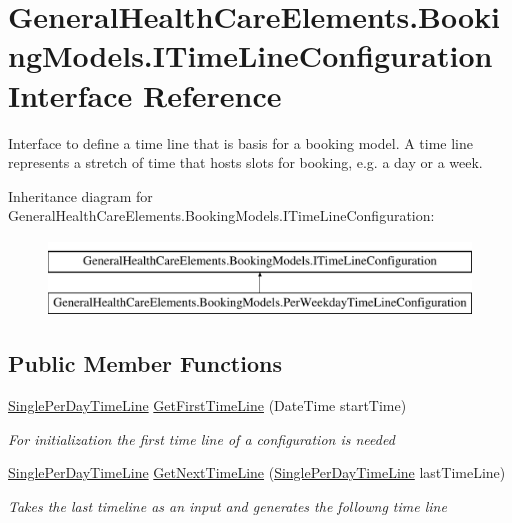 \hypertarget{interface_general_health_care_elements_1_1_booking_models_1_1_i_time_line_configuration}{}\section{General\+Health\+Care\+Elements.\+Booking\+Models.\+I\+Time\+Line\+Configuration Interface Reference}
\label{interface_general_health_care_elements_1_1_booking_models_1_1_i_time_line_configuration}


Interface to define a time line that is basis for a booking model. A time line represents a stretch of time that hosts slots for booking, e.\+g. a day or a week.  


Inheritance diagram for General\+Health\+Care\+Elements.\+Booking\+Models.\+I\+Time\+Line\+Configuration\+:\begin{figure}[H]
\begin{center}
\leavevmode
\includegraphics[height=2.000000cm]{interface_general_health_care_elements_1_1_booking_models_1_1_i_time_line_configuration}
\end{center}
\end{figure}
\subsection*{Public Member Functions}
\begin{DoxyCompactItemize}
\item 
\hyperlink{class_general_health_care_elements_1_1_booking_models_1_1_single_per_day_time_line}{Single\+Per\+Day\+Time\+Line} \hyperlink{interface_general_health_care_elements_1_1_booking_models_1_1_i_time_line_configuration_a32ab23cf6e256ac1391eada96740e3ed}{Get\+First\+Time\+Line} (Date\+Time start\+Time)
\begin{DoxyCompactList}\small\item\em For initialization the first time line of a configuration is needed \end{DoxyCompactList}\item 
\hyperlink{class_general_health_care_elements_1_1_booking_models_1_1_single_per_day_time_line}{Single\+Per\+Day\+Time\+Line} \hyperlink{interface_general_health_care_elements_1_1_booking_models_1_1_i_time_line_configuration_ac9cad79d8ee87386078722a848f837ec}{Get\+Next\+Time\+Line} (\hyperlink{class_general_health_care_elements_1_1_booking_models_1_1_single_per_day_time_line}{Single\+Per\+Day\+Time\+Line} last\+Time\+Line)
\begin{DoxyCompactList}\small\item\em Takes the last timeline as an input and generates the followng time line \end{DoxyCompactList}\end{DoxyCompactItemize}


